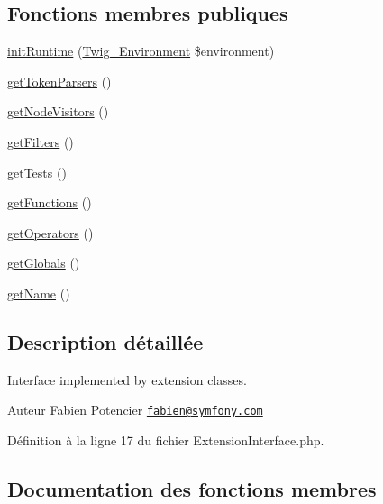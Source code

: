 \subsection*{Fonctions membres publiques}
\begin{DoxyCompactItemize}
\item 
\hyperlink{interface_twig___extension_interface_ab17a2e5ce3e5789febe1f3a96e61ec38}{init\+Runtime} (\hyperlink{class_twig___environment}{Twig\+\_\+\+Environment} \$environment)
\item 
\hyperlink{interface_twig___extension_interface_a8fd35903c3d01c0f0078f59d142eb063}{get\+Token\+Parsers} ()
\item 
\hyperlink{interface_twig___extension_interface_aec02093179d390d22ae4083f23a1d74a}{get\+Node\+Visitors} ()
\item 
\hyperlink{interface_twig___extension_interface_a428d91319fc73d3038784cf5436936b6}{get\+Filters} ()
\item 
\hyperlink{interface_twig___extension_interface_a7e247dd31cc8d37a6c97353a062a0080}{get\+Tests} ()
\item 
\hyperlink{interface_twig___extension_interface_a131c2522f07821f77cd1d038c216031b}{get\+Functions} ()
\item 
\hyperlink{interface_twig___extension_interface_aeaf58da661970280d00b67c17dc4f8d4}{get\+Operators} ()
\item 
\hyperlink{interface_twig___extension_interface_ae3a26252ce6efe503698085a7ed69dad}{get\+Globals} ()
\item 
\hyperlink{interface_twig___extension_interface_a3d0963e68bb313b163a73f2803c64600}{get\+Name} ()
\end{DoxyCompactItemize}


\subsection{Description détaillée}
Interface implemented by extension classes.

\begin{DoxyAuthor}{Auteur}
Fabien Potencier \href{mailto:fabien@symfony.com}{\tt fabien@symfony.\+com} 
\end{DoxyAuthor}


Définition à la ligne 17 du fichier Extension\+Interface.\+php.



\subsection{Documentation des fonctions membres}
